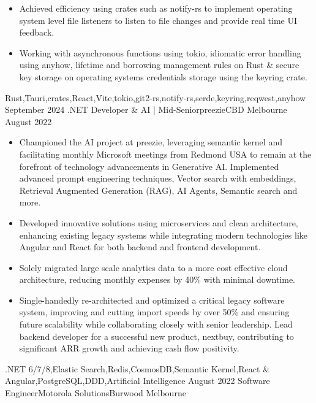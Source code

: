 \begin{experiences}
{\begin{itemize}
						\item Achieved efficiency using crates such as notify-rs to implement operating system level file listeners to listen to file changes and provide real time UI feedback.
                        \item Working with asynchronous functions using tokio, idiomatic error handling using anyhow, lifetime and borrowing management rules on Rust \& secure key storage on operating systems credentials storage using the keyring crate.
                      \end{itemize}
                    }
                    {Rust,Tauri,crates,React,Vite,tokio,git2-rs,notify-rs,serde,keyring,reqwest,anyhow}
  \emptySeparator
  \experience
    {September 2024}   {.NET Developer \& AI | Mid-Senior}{preezie}{CBD Melbourne}
    {August 2022} {
                      \begin{itemize}
					    \item Championed the AI project at preezie, leveraging semantic kernel and facilitating monthly Microsoft meetings from Redmond USA to remain at the forefront of technology advancements in Generative AI. Implemented advanced prompt engineering techniques, Vector search with embeddings, Retrieval Augmented Generation (RAG), AI Agents, Semantic search and more.
                        \item Developed innovative solutions using microservices and clean architecture, enhancing existing legacy systems while integrating modern technologies like Angular and React for both backend and frontend development.       
                        \item Solely migrated large scale analytics data to a more cost effective cloud architecture, reducing monthly expenses by 40\% with minimal downtime.
                        \item Single-handedly re-architected and optimized a critical legacy software system, improving and cutting import speeds by over 50\% and ensuring future scalability while collaborating closely with senior leadership. Lead backend developer for a successful new product, nextbuy, contributing to significant ARR growth and achieving cash flow positivity.                                                                   
                      \end{itemize}
                    }
                    {.NET 6/7/8,Elastic Search,Redis,CosmosDB,Semantic Kernel,React \& Angular,PostgreSQL,DDD,Artificial Intelligence}
  \emptySeparator
  \experience
    {August 2022} {Software Engineer}{Motorola Solutions}{Burwood Melbourne}

\end{experiences}
